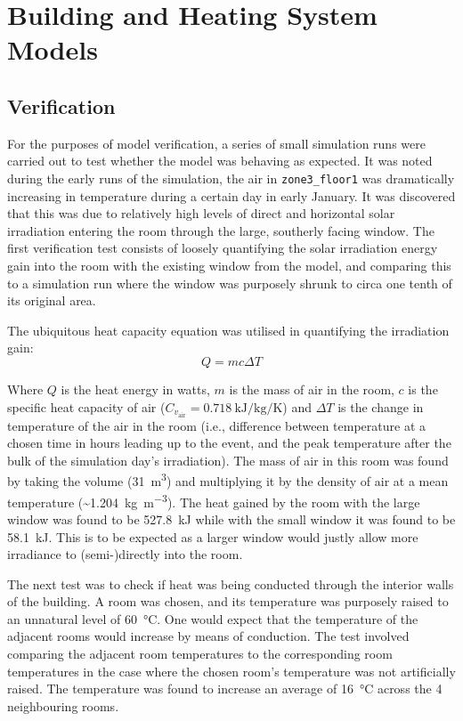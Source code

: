\section{Building and Heating System Models}\label{sec:methodheatingsys}



\subsection{Verification} \label{subsubsec:verification}
For the purposes of model verification, a series of small simulation runs were carried out to test whether the model was behaving as expected. It was noted during the early runs of the simulation, the air in \texttt{zone3\_floor1} was dramatically increasing in temperature during a certain day in early January. It was discovered that this was due to relatively high levels of direct and horizontal solar irradiation entering the room through the large, southerly facing window. The first verification test consists of loosely quantifying the solar irradiation energy gain into the room with the existing window from the model, and comparing this to a simulation run where the window was purposely shrunk to circa one tenth of its original area. 

The ubiquitous heat capacity equation was utilised in quantifying the irradiation gain: 
\begin{equation}
    Q = mc\Delta T 
\end{equation} 

Where $Q$ is the heat energy in watts, $m$ is the mass of air in the room, $c$ is the specific heat capacity of air ($C_{v_\text{air}} = \qty{0.718}{\kilo\joule\per\kilo\gram\per\kelvin}$) and $\Delta T$ is the change in temperature of the air in the room (i.e., difference between temperature at a chosen time in hours leading up to the event, and the peak temperature after the bulk of the simulation day's irradiation). The mass of air in this room was found by taking the volume (\qty{31}{\meter\cubed}) and multiplying it by the density of air at a mean temperature (\sim \qty{1.204}{\kilo\gram\per\cubic\meter}). 
The heat gained by the room with the large window was found to be \qty{527.8}{\kilo\joule} while with the small window it was found to be \qty{58.1}{\kilo\joule}. This is to be expected as a larger window would justly allow more irradiance to (semi-)directly into the room. 

The next test was to check if heat was being conducted through the interior walls of the building. A room was chosen, and its temperature was purposely raised to an unnatural level of \qty{60}{\celsius}. One would expect that the temperature of the adjacent rooms would increase by means of conduction. The test involved comparing the adjacent room temperatures to the corresponding room temperatures in the case where the chosen room's temperature was not artificially raised. The temperature was found to increase an average of \qty{16}{\celsius} across the 4 neighbouring rooms. 


